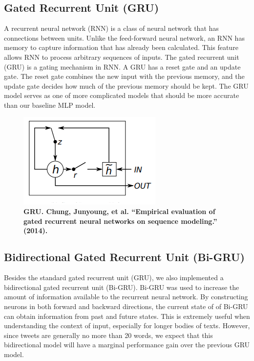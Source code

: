 \documentclass[11pt,a4paper]{article}
\begin{document}
	
	\subsection{Gated Recurrent Unit (GRU)}
	A recurrent neural network (RNN) is a class of neural network that has connections between units. Unlike the feed-forward neural network, an RNN has memory to capture information that has already been calculated. This feature allows RNN to process arbitrary sequences of inputs. The gated recurrent unit (GRU) is a gating mechanism in RNN. A GRU has a reset gate and an update gate. The reset gate combines the new input with the previous memory, and the update gate decides how much of the previous memory should be kept. The GRU model serves as one of more complicated models that should be more accurate than our baseline MLP model.
	
	\begin{figure}[H]
		\centering\includegraphics[scale=0.7]{gru} 
		\caption{\textbf{ GRU. Chung, Junyoung, et al. “Empirical evaluation of gated recurrent neural networks on sequence modeling.” (2014).}}
	\end{figure}

	
	
	
	\subsection{Bidirectional Gated Recurrent Unit (Bi-GRU)}
	\label{sect:pdf}
	
	Besides the standard gated recurrent unit (GRU), we also implemented a bidirectional gated recurrent unit (Bi-GRU). Bi-GRU was used to increase the amount of information available to the recurrent neural network. By constructing neurons in both forward and backward directions, the current state of of Bi-GRU can obtain information from past and future states. This is extremely useful when understanding the context of input, especially for longer bodies of texts. However, since tweets are generally no more than 20 words, we expect that this bidirectional model will have a marginal performance gain over the previous GRU model.
	
\end{document}
